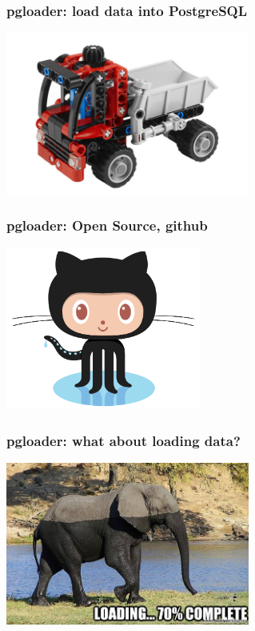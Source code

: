 \documentclass{beamer}
\begin{document}
\begin{frame}
  \frametitle{pgloader: load data into PostgreSQL}


  \begin{center}
    \includegraphics[height=2.1in]{pgloader.jpg}
  \end{center}
\end{frame}

\begin{frame}
  \frametitle{pgloader: Open Source, github}


  \begin{center}
    \includegraphics[height=2.1in]{Octocat.png}
  \end{center}
\end{frame}

\begin{frame}
  \frametitle{pgloader: what about loading data?}


  \begin{center}
    \includegraphics[height=2.1in]{elephant-loading.jpg}
  \end{center}
\end{frame}
\end{document}
